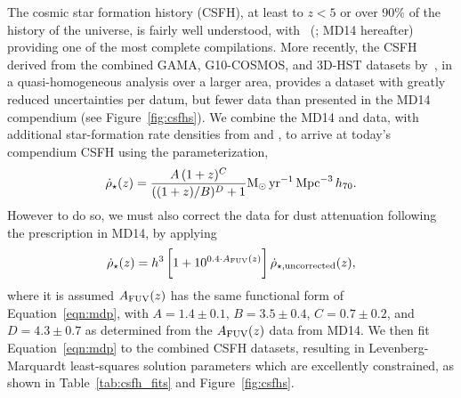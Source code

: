 \documentclass[apj, twocolumn]{aastex62}
\begin{document}
The cosmic star formation history (CSFH), at least to $z < 5$ or over 90\% of the history of the universe, is fairly well understood, with~\citeauthor{Madau:2014fk} (\citeyear{Madau:2014fk}; MD14 hereafter) providing one of the most complete compilations. More recently, the CSFH derived from the combined GAMA, G10-COSMOS, and 3D-HST datasets by~\cite{Driver:2018nr}, in a quasi-homogeneous analysis over a larger area, provides a dataset with greatly reduced uncertainties per datum, but fewer data than presented in the MD14 compendium (see Figure~\ref{fig:csfhs}).  We combine the MD14 and \cite{Driver:2018nr} data, with additional star-formation rate densities from \cite{Bouwens:2015qy} and \cite{Khusanova:2019kx}, to arrive at today's compendium CSFH using the parameterization,
\begin{equation}
\dot{\rho}_{\star}(z) = \frac{A\,(1+z)^C}{((1+z)/B)^D+1} {\rm M}_{\odot}\, {\rm yr}^{-1}\, {\rm Mpc}^{-3}\, h_{70}.\label{eqn:mdp}
\end{equation}
However to do so, we must also correct the \cite{Driver:2018nr} data for dust attenuation following the prescription in MD14, by applying 
\begin{equation}
	\dot{\rho}_{\star}(z) =h^3\,\biggl[1+10^{0.4\cdot A_{\rm FUV}(z)}\biggr]\, \dot{\rho}_{\star, {\rm uncorrected}}(z),
\end{equation}
\noindent where it is assumed $A_{\rm FUV}(z)$ has the same functional form of Equation~\ref{eqn:mdp}, with $A=1.4\pm0.1$, $B=3.5\pm0.4$, $C=0.7\pm0.2$, and $D=4.3\pm0.7$ as determined from the $A_{\rm FUV}(z)$ data from MD14. We then fit Equation~\ref{eqn:mdp} to the combined CSFH datasets, resulting in Levenberg-Marquardt least-squares solution parameters which are excellently constrained, as shown in Table~\ref{tab:csfh_fits} and Figure~\ref{fig:csfhs}. 
\end{document}
